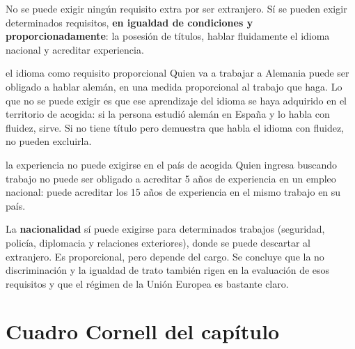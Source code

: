 \documentclass[12pt,oneside]{book}
\begin{document}
No se puede exigir ningún requisito extra por ser extranjero. Sí se pueden exigir determinados requisitos, \textbf{en igualdad de condiciones y proporcionadamente}: la posesión de títulos, hablar fluidamente el idioma nacional y acreditar experiencia.

\begin{example}{el idioma como requisito proporcional}
Quien va a trabajar a Alemania puede ser obligado a hablar alemán, en una medida proporcional al trabajo que haga. Lo que no se puede exigir es que ese aprendizaje del idioma se haya adquirido en el territorio de acogida: si la persona estudió alemán en España y lo habla con fluidez, sirve. Si no tiene título pero demuestra que habla el idioma con fluidez, no pueden excluirla.
\end{example}

\begin{example}{la experiencia no puede exigirse en el país de acogida}
Quien ingresa buscando trabajo no puede ser obligado a acreditar 5 años de experiencia en un empleo nacional: puede acreditar los 15 años de experiencia en el mismo trabajo en su país.
\end{example}

La \textbf{nacionalidad} sí puede exigirse para determinados trabajos (seguridad, policía, diplomacia y relaciones exteriores), donde se puede descartar al extranjero. Es proporcional, pero depende del cargo. Se concluye que la no discriminación y la igualdad de trato también rigen en la evaluación de esos requisitos y que el régimen de la Unión Europea es bastante claro.

\section{Cuadro Cornell del capítulo}
\end{document}
